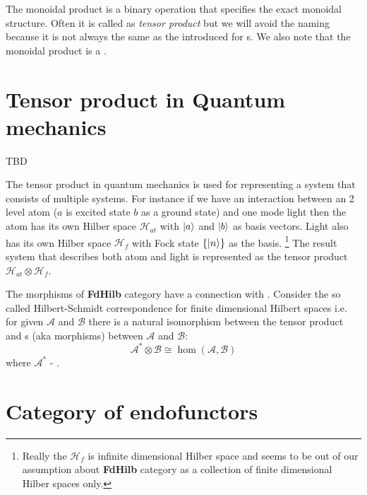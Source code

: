 \begin{remark}
\label{rem:monoidal_product}
The monoidal product is a binary operation that specifies the exact
monoidal structure. Often it is called as \textit{tensor product} but
we will avoid the naming because it is not always the same as the
 introduced for
s. We also note that the monoidal product is
a . 
\end{remark}

\section{Tensor product in Quantum mechanics}

\begin{definition}
  \label{def:tensor_product}
  TBD
\end{definition}

The tensor product in quantum mechanics is used for
representing a system that consists of multiple systems. For instance
if we have an interaction between an 2 level atom ($a$ is excited
state $b$ as a ground state) and one mode light then the
atom has its own Hilber space $\mathcal{H}_{at}$ with $\ket{a}$ and
$\ket{b}$ as basis 
vectors.  Light also has its own Hilber space $\mathcal{H}_f$ with Fock state
$\{\ket{n}\}$ as the basis.
\footnote{
  Really the $\mathcal{H}_f$ is infinite dimensional Hilber space and
  seems to be out of our assumption about \textbf{FdHilb} category as
  a collection of finite dimensional Hilber spaces only.
}
The result system that describes both atom
and light is represented as the tensor product $\mathcal{H}_{at}
\otimes \mathcal{H}_f$.

\begin{remark}
The morphisms of \textbf{FdHilb} category have a connection with
. Consider the so called Hilbert-Schmidt
correspondence for finite dimensional Hilbert spaces i.e. for given
$\mathcal{A}$ and $\mathcal{B}$ there is a natural isomorphism between
the tensor product and s (aka morphisms) between
$\mathcal{A}$ and $\mathcal{B}$:
\[
\mathcal{A}^\ast \otimes \mathcal{B} \cong \hom(\mathcal{A}, \mathcal{B})
\]
where $\mathcal{A}^\ast$ - .
\end{remark}

\section{Category of endofunctors}

